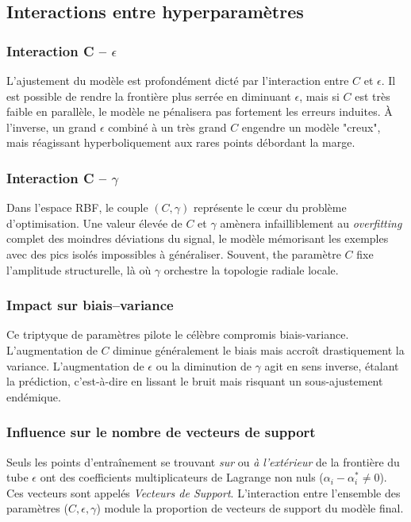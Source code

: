\subsection{Interactions entre hyperparamètres}

\subsubsection{Interaction C -- $\epsilon$}
L'ajustement du modèle est profondément dicté par l'interaction entre $C$ et $\epsilon$. Il est possible de rendre la frontière plus serrée en diminuant $\epsilon$, mais si $C$ est très faible en parallèle, le modèle ne pénalisera pas fortement les erreurs induites. À l'inverse, un grand $\epsilon$ combiné à un très grand $C$ engendre un modèle "creux", mais réagissant hyperboliquement aux rares points débordant la marge.

\subsubsection{Interaction C -- $\gamma$}
Dans l'espace RBF, le couple $(C, \gamma)$ représente le cœur du problème d'optimisation. Une valeur élevée de $C$ et $\gamma$ amènera infailliblement au \textit{overfitting} complet des moindres déviations du signal, le modèle mémorisant les exemples avec des pics isolés impossibles à généraliser. Souvent, the paramètre $C$ fixe l'amplitude structurelle, là où $\gamma$ orchestre la topologie radiale locale.

\subsubsection{Impact sur biais--variance}
Ce triptyque de paramètres pilote le célèbre compromis biais-variance. L'augmentation de $C$ diminue généralement le biais mais accroît drastiquement la variance. L'augmentation de $\epsilon$ ou la diminution de $\gamma$ agit en sens inverse, étalant la prédiction, c'est-à-dire en lissant le bruit mais risquant un sous-ajustement endémique.

\subsubsection{Influence sur le nombre de vecteurs de support}
Seuls les points d'entraînement se trouvant \textit{sur} ou \textit{à l'extérieur} de la frontière du tube $\epsilon$ ont des coefficients multiplicateurs de Lagrange non nuls ($\alpha_i - \alpha_i^* \neq 0$). Ces vecteurs sont appelés \textit{Vecteurs de Support}. L'interaction entre l'ensemble des paramètres ($C, \epsilon, \gamma$) module la proportion de vecteurs de support du modèle final.

